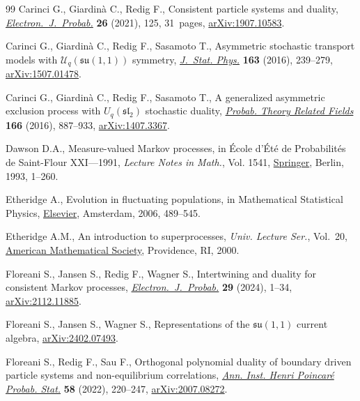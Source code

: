 \documentclass[pdftex]{sigma}
\numberwithin{equation}{section}
\newcommand{\1}{\mathbbm{1}}
\begin{document}
\begin{thebibliography}{99}
Carinci G., Giardin\`a C., Redig F., Consistent particle systems and duality,
 \href{https://doi.org/10.1214/21-ejp684}{\textit{Electron.~J.~Probab.}} \textbf{26} (2021), 125, 31~pages,
 \href{https://arxiv.org/abs/1907.10583}{arXiv:1907.10583}.

Carinci G., Giardin\`a C., Redig F., Sasamoto T., Asymmetric stochastic
 transport models with {$\mathcal{U}_q(\mathfrak{su}(1,1))$} symmetry,
 \href{https://doi.org/10.1007/s10955-016-1473-4}{\textit{J.~Stat. Phys.}} \textbf{163} (2016), 239--279, \href{https://arxiv.org/abs/1507.01478}{arXiv:1507.01478}.

Carinci G., Giardin\`a C., Redig F., Sasamoto T., A generalized asymmetric
 exclusion process with {$U_q(\mathfrak{sl}_2)$} stochastic duality,
 \href{https://doi.org/10.1007/s00440-015-0674-0}{\textit{Probab. Theory Related Fields}} \textbf{166} (2016), 887--933,
 \href{https://arxiv.org/abs/1407.3367}{arXiv:1407.3367}.

Dawson D.A., Measure-valued {M}arkov processes, in \'Ecole d'\'Et\'e de
 {P}robabilit\'es de {S}aint-{F}lour {XXI}---1991, \textit{Lecture Notes in
 Math.}, Vol. 1541, \href{https://doi.org/10.1007/BFb0084190}{Springer}, Berlin, 1993, 1--260.

Etheridge A., Evolution in fluctuating populations, in Mathematical Statistical
 Physics, \href{https://doi.org/10.1016/S0924-8099(06)80048-X}{Elsevier}, Amsterdam, 2006, 489--545.

Etheridge A.M., An introduction to superprocesses, \textit{Univ. Lecture Ser.},
 Vol.~20, \href{https://doi.org/10.1090/ulect/020}{American Mathematical Society}, Providence, RI, 2000.

Floreani S., Jansen S., Redig F., Wagner S., Intertwining and duality for
 consistent {M}arkov processes, \href{https://doi.org/10.1214/24-ejp1124}{\textit{Electron.~J.~Probab.}} \textbf{29}
 (2024), 1--34, \href{https://arxiv.org/abs/2112.11885}{arXiv:2112.11885}.

Floreani S., Jansen S., Wagner S., Representations of the $\mathfrak{su}(1,1)$
 current algebra, \href{https://arxiv.org/abs/2402.07493}{arXiv:2402.07493}.

Floreani S., Redig F., Sau F., Orthogonal polynomial duality of boundary driven
 particle systems and non-equilibrium correlations, \href{https://doi.org/10.1214/21-aihp1163}{\textit{Ann. Inst. Henri
 Poincar\'e Probab. Stat.}} \textbf{58} (2022), 220--247, \href{https://arxiv.org/abs/2007.08272}{arXiv:2007.08272}.


\end{thebibliography}
\end{document}
